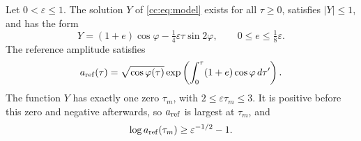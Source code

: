 \begin{lemma}\label{cc:lem:model}
Let $0<\varepsilon\le1$. The solution $Y$ of \eqref{cc:eq:model}
exists for all $\tau\ge0$, satisfies $|Y|\le1$, and has the form
\begin{equation}\label{cc:eq:Y-ansatz}
 Y=(1+e)\cos\varphi-\tfrac14\varepsilon\tau\sin2\varphi,
 \qquad 0\le e\le\tfrac18\varepsilon.
\end{equation}
The reference amplitude satisfies
\begin{equation}\label{cc:eq:reference-amplitude}
 a_{\rm ref}(\tau)=\sqrt{\cos\varphi(\tau)}
       \exp\left(\int_0^\tau(1+e)\cos\varphi\,d\tau'\right).
\end{equation}
The function $Y$ has exactly one zero $\tau_m$, with
$2\le\varepsilon\tau_m\le3$. It is positive before this zero and
negative afterwards, so $a_{\rm ref}$ is largest at $\tau_m$, and
\[
 \log a_{\rm ref}(\tau_m)\ge\varepsilon^{-1/2}-1.
\]
\end{lemma}
